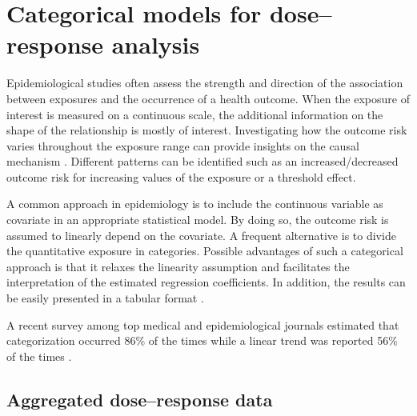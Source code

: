 \documentclass[11pt,a4paper,twoside,openany]{book}\usepackage{knitr}
\begin{document}
{{\section{Categorical models for dose--response analysis}

Epidemiological studies often assess the strength and direction of the association between exposures and the occurrence of a health outcome. When the exposure of interest is measured on a continuous scale, the additional information on the shape of the relationship is mostly of interest. Investigating how the outcome risk varies throughout the exposure range can provide insights on the causal mechanism \citep{hill1965environment}. Different patterns can be identified such as an increased/decreased outcome risk for increasing values of the exposure or a threshold effect.

A common approach in epidemiology is to include the continuous variable as covariate in an appropriate statistical model. By doing so, the outcome risk is assumed to linearly depend on the covariate. A frequent alternative is to divide the quantitative exposure in categories.
Possible advantages of such a categorical approach is that it relaxes the linearity assumption and facilitates the interpretation of the estimated regression coefficients. In addition, the results can be easily presented in a tabular format \citep{orsini2011procedure}.

\noindent A recent survey among top medical and epidemiological journals estimated that categorization occurred 86\% of the times while a linear trend was reported 56\% of the times \citep{turner2010categorisation}.



\subsection{Aggregated dose--response data}

}}
\end{document}
